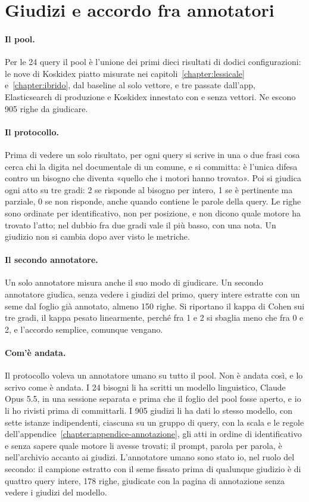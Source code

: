 \section{Giudizi e accordo fra annotatori}\label{sec:giudizi}

\paragraph{Il pool.} Per le 24 query il pool è l'unione dei primi dieci risultati
di dodici configurazioni: le nove di Koskidex piatto misurate nei
capitoli~\ref{chapter:lessicale} e~\ref{chapter:ibrido}, dal baseline al solo
vettore, e tre passate dall'app, Elasticsearch di produzione e Koskidex innestato
con e senza vettori. Ne escono 905 righe da giudicare.

\paragraph{Il protocollo.} Prima di vedere un solo risultato, per ogni query si
scrive in una o due frasi cosa cerca chi la digita nel documentale di un comune,
e si committa: è l'unica difesa contro un bisogno che diventa «quello che i motori
hanno trovato». Poi si giudica ogni atto su tre gradi: 2 se risponde al bisogno
per intero, 1 se è pertinente ma parziale, 0 se non risponde, anche quando
contiene le parole della query. Le righe sono ordinate per identificativo, non per
posizione, e non dicono quale motore ha trovato l'atto; nel dubbio fra due gradi
vale il più basso, con una nota. Un giudizio non si cambia dopo aver visto le
metriche.

\paragraph{Il secondo annotatore.} Un solo annotatore misura anche il suo modo di
giudicare. Un secondo annotatore giudica, senza vedere i giudizi del primo,
query intere estratte con un seme dal foglio già annotato, almeno 150 righe. Si
riportano il kappa di Cohen sui tre gradi, il kappa pesato linearmente, perché
fra 1 e 2 si sbaglia meno che fra 0 e 2, e l'accordo semplice, comunque vengano.

\paragraph{Com'è andata.} Il protocollo voleva un annotatore umano su tutto il
pool. Non è andata così, e lo scrivo come è andata. I 24 bisogni li ha scritti
un modello linguistico, Claude Opus 5.5, in una sessione separata e prima che
il foglio del pool fosse aperto, e io li ho rivisti prima di committarli. I 905
giudizi li ha dati lo stesso modello, con sette istanze indipendenti, ciascuna
su un gruppo di query, con la scala e le regole dell'appendice~\ref{chapter:appendice-annotazione},
gli atti in ordine di identificativo e senza sapere quale motore li avesse
trovati; il prompt, parola per parola, è nell'archivio accanto ai giudizi.
L'annotatore umano sono stato io, nel ruolo del secondo: il campione estratto
con il seme fissato prima di qualunque giudizio è di quattro query intere, 178
righe, giudicate con la pagina di annotazione senza vedere i giudizi del
modello.

